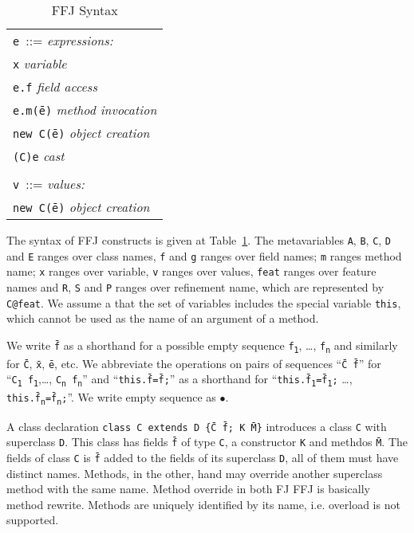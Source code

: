 \begin{table}[!ht]
\begin{tabularx}{.4\textwidth}{l}
            \texttt{e}~::= \hfill \textit{expressions:}\\
            \quad \texttt{x} \hfill\textit{variable}\\ 
            \quad \texttt{e.f} \hfill\textit{field access}\\
            \quad \texttt{e.m(\={e})} \hfill\textit{method invocation}\\
            \quad \texttt{new~C(\={e})} \hfill\textit{object creation}\\
            \quad \texttt{(C)e} \hfill\textit{cast}\\ \\
            \texttt{v}~::= \hfill \textit{values:}\\
            \quad \texttt{new~C(\={e})} \hfill\textit{object creation}
    \end{tabularx}
    \quad
    \caption{\ac{FFJ} Syntax}
    \label{abstractsyntax}
\end{table}


The syntax of \ac{FFJ} constructs is given at Table~\ref{abstractsyntax}. The metavariables
\texttt{A}, \texttt{B}, \texttt{C}, \texttt{D} and \texttt{E} ranges over class names, \texttt{f} and \texttt{g} ranges over
field names; \texttt{m} ranges method name; \texttt{x} ranges over variable, \texttt{v} ranges over
values, \texttt{feat} ranges over feature names and 
\texttt{R}, \texttt{S} and \texttt{P} ranges over refinement name, which are represented by \texttt{C@feat}.
We assume a that the set of variables includes the special variable \texttt{this}, which
cannot be used as the name of an argument of a method.

We write \texttt{\=f} as a shorthand for a possible empty sequence \texttt{f\textsubscript1}, \dots, \texttt{f\textsubscript{n}} 
and similarly for \texttt{\=C}, \texttt{\=x}, \texttt{\=e}, etc. We abbreviate the operations on pairs of sequences
``\texttt{\=C~\=f}'' for ``\texttt{C\textsubscript1~f\textsubscript1},\dots, \texttt{C\textsubscript{n}~f\textsubscript{n}}''
and ``\texttt{this.\=f=\=f;}'' as a shorthand for 
``\texttt{this.\=f\textsubscript1=\=f\textsubscript1;} \dots, \texttt{this.\=f\textsubscript{n}=\=f\textsubscript{n};}''.
We write empty sequence as $\bullet$.


A class declaration \texttt{class\ C~extends~D\ \{\={C} \={f}; K \={M}\}} 
introduces a class \texttt{C} with superclass \texttt{D}. This class has fields \texttt{\=f}
of type \texttt{C}, a constructor \texttt{K} and methdos \texttt{\=M}. The fields of class \texttt{C}
is \texttt{\=f} added to the fields of its superclass \texttt{D}, all of them must have distinct names.
Methods, in the other, hand may override another superclass method with the same name.
Method override in both \ac{FJ} \ac{FFJ} is basically method rewrite. 
Methods are uniquely identified by its name, i.e. overload is not supported.

